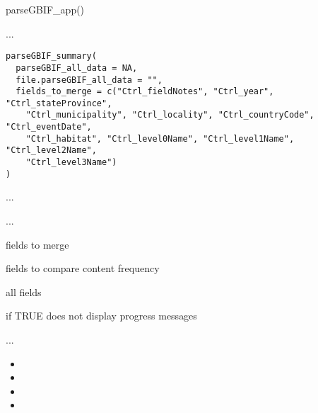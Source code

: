 \documentclass[a4paper]{book}
\begin{document}
%
\begin{Examples}
\begin{ExampleCode}

parseGBIF_app()

\end{ExampleCode}
\end{Examples}
%
\begin{Description}
...
\end{Description}
%
\begin{Usage}
\begin{verbatim}
parseGBIF_summary(
  parseGBIF_all_data = NA,
  file.parseGBIF_all_data = "",
  fields_to_merge = c("Ctrl_fieldNotes", "Ctrl_year", "Ctrl_stateProvince",
    "Ctrl_municipality", "Ctrl_locality", "Ctrl_countryCode", "Ctrl_eventDate",
    "Ctrl_habitat", "Ctrl_level0Name", "Ctrl_level1Name", "Ctrl_level2Name",
    "Ctrl_level3Name")
)
\end{verbatim}
\end{Usage}
%
\begin{Arguments}
\begin{ldescription}
\item[\code{parseGBIF\_all\_data}] ...

\item[\code{file.parseGBIF\_all\_data}] ...

\item[\code{fields\_to\_merge}] fields to merge

\item[\code{fields\_to\_compare}] fields to compare content frequency

\item[\code{fields\_to\_parse}] all fields

\item[\code{silence}] if TRUE does not display progress messages
\end{ldescription}
\end{Arguments}
%
\begin{Details}
...
\end{Details}
%
\begin{Value}
\begin{itemize}

\item{} 
\item{} 
\item{} 
\item{} 

\end{itemize}

\end{Value}
\end{document}
